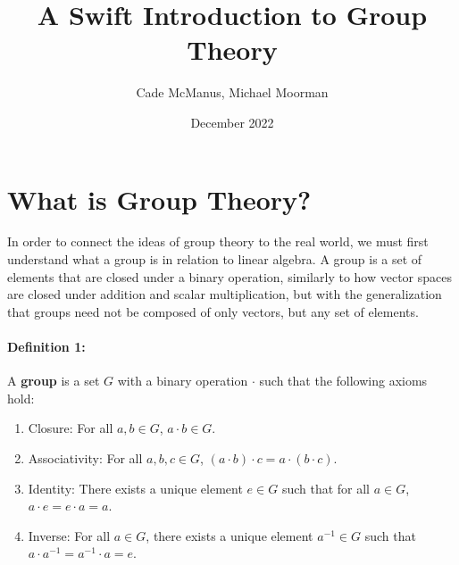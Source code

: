 \documentclass{article}
\title{\textbf{A Swift Introduction to Group Theory}}
\author{Cade McManus, Michael Moorman}
\date{December 2022}
\begin{document}
\maketitle

\section{What is Group Theory?}

In order to connect the ideas of group theory to the real world, we must first understand what a group is 
in relation to linear algebra. A group is a set of elements that are closed under a binary operation,
similarly to how vector spaces are closed under addition and scalar multiplication, but with the 
generalization that groups need not be composed of only vectors, but any set of elements.

\paragraph*{Definition 1:} A \textbf{group} is a set $G$ with a binary operation $\cdot$ 
such that the following axioms hold:
\begin{enumerate}
    \item Closure: For all $a,b \in G$, $a \cdot b \in G$.
    \item Associativity: For all $a,b,c \in G$, $(a \cdot b) \cdot c = a \cdot (b \cdot c)$.
    \item Identity: There exists a unique element $e \in G$ such that for all $a \in G$, $a \cdot e = e \cdot a = a$.
    \item Inverse: For all $a \in G$, there exists a unique element $a^{-1} \in G$ such that $a \cdot a^{-1} = a^{-1} \cdot a = e$.
\end{enumerate}
\end{document}
